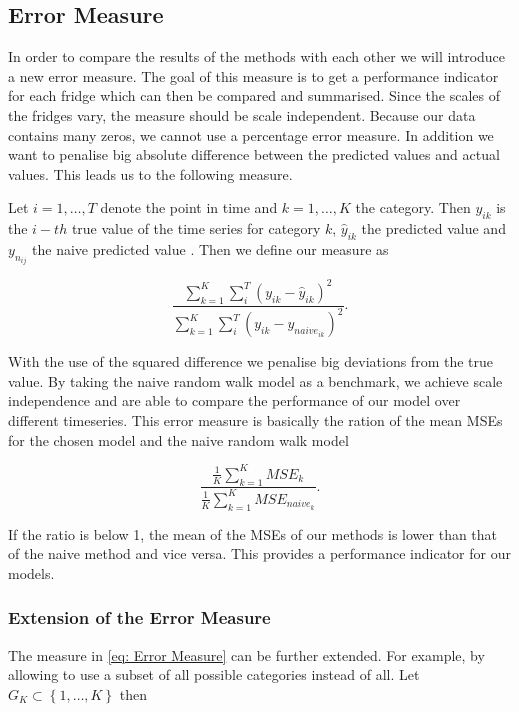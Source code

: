 \subsection{Error Measure}
\label{sec: Error Measure}

In order to compare the results of the methods with each other we will introduce a new error measure. The goal of this measure is to get a performance indicator for each fridge which can then be compared and summarised. Since the scales of the fridges vary, the measure should be scale independent. Because our data contains many zeros, we cannot use a percentage error measure. In addition we want to penalise big absolute difference between the predicted values and actual values. This leads us to the following measure.

Let $i = 1,\ldots,T$ denote the point in time and $k=1,\ldots,K$ the category. Then $y_{ik}$ is the $i-th$ true value of the time series for category $k$, $\hat{y}_{ik}$ the predicted value and $y_{n_{ij}}$ the naive predicted value . Then we define our measure as

\begin{equation}
\frac{\sum_{k=1}^{K}\sum_{i}^T(y_{ik}-\hat{y}_{ik})^2}{\sum_{k=1}^{K}\sum_{i}^T(y_{ik}-y_{naive_{ik}})^2}.
\label{eq: Error Measure}
\end{equation}

With the use of the squared difference we penalise big deviations from the true value. By taking the naive random walk model as a benchmark, we achieve scale independence and are able to compare the performance of our model over different timeseries. This error measure is basically the ration of the mean MSEs for the chosen model and the naive random walk model

\begin{equation}
\frac{\frac{1}{K}\sum_{k=1}^K MSE_k}{\frac{1}{K}\sum_{k=1}^K MSE_{naive_k}}.
\label{eq: Error Measure MSE}
\end{equation}

If the ratio is below 1, the mean of the MSEs of our methods is lower than that of the naive method and vice versa. This provides a performance indicator for our models. 

\subsubsection{Extension of the Error Measure}
\label{sec:Error Measure Extension}

The measure in \ref{eq: Error Measure} can be further extended. For example, by allowing to use a subset of all possible categories instead of all. Let $G_K \subset \left\{1,\ldots,K\right\}$ then


